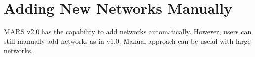 \section{Adding New Networks Manually}
MARS v2.0 has the capability to add networks automatically. However, users can still manually add networks as in v1.0. Manual approach can be useful with large networks.
